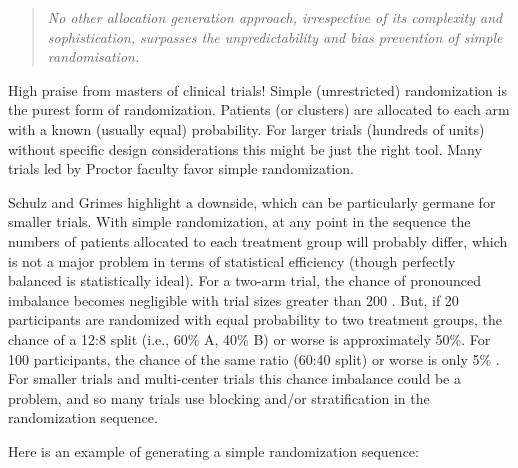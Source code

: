 \documentclass[
]{book}
\begin{document}
\begin{quote}
\emph{No other allocation generation approach, irrespective of its complexity and sophistication, surpasses the unpredictability and bias prevention of simple randomisation.}
\end{quote}

High praise from masters of clinical trials! \citep{Schulz2002-jf} Simple (unrestricted) randomization is the purest form of randomization. Patients (or clusters) are allocated to each arm with a known (usually equal) probability. For larger trials (hundreds of units) without specific design considerations this might be just the right tool. Many trials led by Proctor faculty favor simple randomization.

Schulz and Grimes highlight a downside, which can be particularly germane for smaller trials. With simple randomization, at any point in the sequence the numbers of patients allocated to each treatment group will probably differ, which is not a major problem in terms of statistical efficiency (though perfectly balanced is statistically ideal). For a two-arm trial, the chance of pronounced imbalance becomes negligible with trial sizes greater than 200 \citep{Lachin1988-gg, Schulz2002-jf}. But, if 20 participants are randomized with equal probability to two treatment groups, the chance of a 12:8 split (i.e., 60\% A, 40\% B) or worse is approximately 50\%. For 100 participants, the chance of the same ratio (60:40 split) or worse is only 5\% \citep{Friedman2015-ri}. For smaller trials and multi-center trials this chance imbalance could be a problem, and so many trials use blocking and/or stratification in the randomization sequence.

Here is an example of generating a simple randomization sequence:
\end{document}
